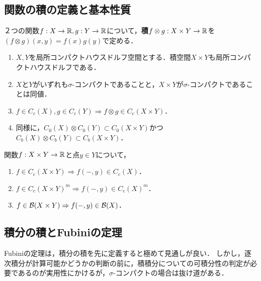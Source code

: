\documentclass[uplatex,dvipdfmx]{jsreport}
\begin{document}
\subsection{関数の積の定義と基本性質}

\begin{definition}[product]
    ２つの関数$f:X\to\mathbb{R},g:Y\to\mathbb{R}$について，\textbf{積}$f\otimes g:X\times Y\to\mathbb{R}$を$(f\otimes g)(x,y)=f(x)g(y)$で定める．
\end{definition}

\begin{lemma}\mbox{}
    \begin{enumerate}
        \item $X,Y$を局所コンパクトハウスドルフ空間とする．積空間$X\times Y$も局所コンパクトハウスドルフである．
        \item $X$と$Y$がいずれも$\sigma$-コンパクトであることと，$X\times Y$が$\sigma$-コンパクトであることは同値．
        \item $f\in C_c(X),g\in C_c(Y)\Rightarrow f\otimes g\in C_c(X\times Y)$．
        \item 同様に，$C_0(X)\otimes C_0(Y)\subset C_0(X\times Y)$かつ$C_b(X)\otimes C_b(Y)\subset C_b(X\times Y)$．
    \end{enumerate}
\end{lemma}

\begin{lemma}
    関数$f:X\times Y\to\mathbb{R}$と点$y\in Y$について，
    \begin{enumerate}
        \item $f\in C_c(X\times Y)\Rightarrow f(-,y)\in C_c(X)$．
        \item $f\in C_c(X\times Y)^m\Rightarrow f(-,y)\in C_c(X)^m$．
        \item $f\in\mathcal{B}(X\times Y)\Rightarrow f(-,y)\in\mathcal{B}(X)$．
    \end{enumerate}
\end{lemma}

\subsection{積分の積とFubiniの定理}

\begin{tcolorbox}[colframe=ForestGreen, colback=ForestGreen!10!white,breakable,colbacktitle=ForestGreen!40!white,coltitle=black,fonttitle=\bfseries\sffamily,
title=]
    Fubiniの定理は，積分の積を先に定義すると極めて見通しが良い．
    しかし，逐次積分が計算可能かどうかの判断の前に，積積分についての可積分性の判定が必要であるのが実用性にかけるが，$\sigma$-コンパクトの場合は抜け道がある．
\end{tcolorbox}
\end{document}
